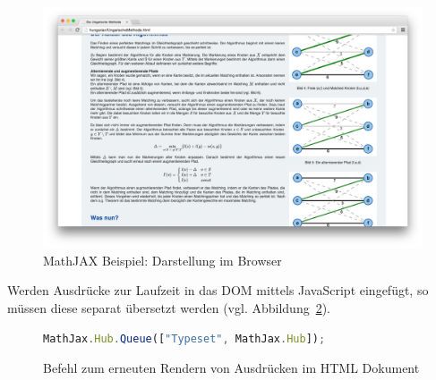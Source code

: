 \begin{figure}[h!]
	\centering
	\includegraphics[width=\textwidth]{figures/mathjax-example}
	\caption[MathJAX Beispiel Browser]{MathJAX Beispiel: Darstellung im Browser}\label{fig:mathjax-example-img}
\end{figure}

Werden Ausdrücke zur Laufzeit in das DOM mittels JavaScript eingefügt, so müssen diese separat übersetzt werden (vgl. Abbildung~\ref{fig:listing-mathjax-render}).

\begin{figure}[h!]
\begin{lstlisting}[language=JavaScript]
MathJax.Hub.Queue(["Typeset", MathJax.Hub]);
\end{lstlisting}
\caption[MathJAX Render Befehl]{Befehl zum erneuten Rendern von Ausdrücken im HTML Dokument}\label{fig:listing-mathjax-render}
\end{figure}

